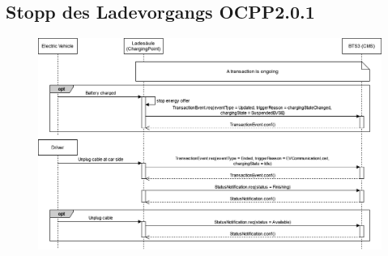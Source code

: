 \subsection{Stopp des Ladevorgangs OCPP2.0.1}
\let\cleardoublepage\clearpage
\begin{figure} [H]
	\centering
	\includegraphics[width=1.0\textwidth]{images/OCPP/Stop_Transaction_OCPP201.drawio.png}
\end{figure}
\newpage

